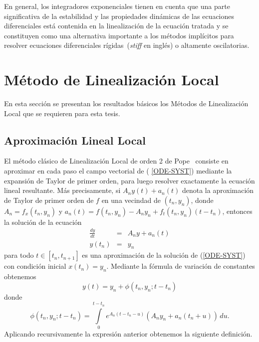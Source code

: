 En general, los integradores exponenciales tienen en cuenta que una parte significativa de la estabilidad y las propiedades dinámicas de las ecuaciones diferenciales está contenida en la linealización de la ecuación tratada y se constituyen como una alternativa importante a los métodos implícitos para resolver ecuaciones diferenciales rígidas~(\textit{stiff} en inglés) o altamente oscilatorias.  


\section{Método de Linealización Local}\label{section:ll-methods}
En esta sección se presentan los resultados básicos los Métodos de Linealización Local que se requieren para esta tesis.

\subsection{Aproximación Lineal Local}

El método clásico de Linealización Local de orden 2 de Pope~\cite{pope1963exponential}
 consiste en aproximar en cada paso el campo vectorial de (%
\ref{ODE-SYST}) mediante la expansión de Taylor de primer orden, para
luego resolver exactamente la ecuación lineal resultante. Más
precisamente, si $A_{n}y(t)+a_{n}(t)$ denota la aproximación de Taylor
de primer orden de $f$ en una vecindad de $(t_n,y_{n})$, donde \mbox{$
	A_{n}=f_{x}(t_n,y_{n})$} y $a_{n}(t)=f(t_n,y_{n})-A_{n}y_{n}+f_t(t_n,y_n)(t-t_n)$, entonces la
solución de la ecuación 
\begin{eqnarray}
\frac{dy}{dt} & = & A_{n}y+a_{n}(t) \label{ODE-SYST-LINEAL-1} \\
y(t_{n})& = & y_{n}  \nonumber
\end{eqnarray}
para todo $t\in[t_{n},t_{n+1}]$ es una aproximación de la solución
de (\ref{ODE-SYST}) con condición inicial \mbox{$x(t_{n})=y_{n}$}. Mediante la fórmula de variación de constantes obtenemos 
\begin{equation*}
y(t)=y_{n}+\phi(t_{n},y_{n};t-t_{n})  %
\end{equation*}
donde 
\begin{equation}
\phi(t_{n},y_{n};t-t_{n})=\int\limits^{t-t_{n}}_{0} e^{{A_{n}(t-t_{n}-u)}}
(A_{n}y_{n}+a_{n}(t_{n}+u))\,du.  \label{REV-PHI-DEF-2}
\end{equation}
Aplicando recursivamente la expresión anterior obtenemos la siguiente
definición.


